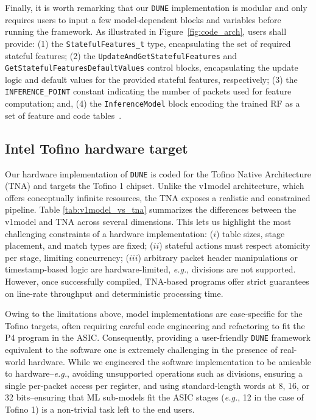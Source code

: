 \documentclass[journal]{IEEEtran}
\theoremstyle{plain} %
\newcommand{\eg}{\textit{e.g.},\xspace}
\newcommand{\name}{\texttt{\fontsize{9}{11}\selectfont DUNE}\xspace}
\begin{document}
Finally, it is worth remarking that our \name implementation is modular and only requires users to input a few model-dependent blocks and variables before running the framework. As illustrated in Figure~\ref{fig:code_arch}, users shall provide: (1) the \texttt{\footnotesize StatefulFeatures\_t} type, encapsulating the set of required stateful features; (2) the \texttt{\footnotesize UpdateAndGetStatefulFeatures} and \texttt{\footnotesize GetStatefulFeaturesDefaultValues} control blocks, encapsulating the update logic and default values for the provided stateful features, respectively; (3) the \texttt{\footnotesize INFERENCE\_POINT} constant indicating the number of packets used for feature computation; and, (4) the \texttt{\footnotesize InferenceModel} block encoding the trained RF as a set of feature and code tables~\cite{ilsy-hotnets19}.

\subsection{Intel Tofino hardware target}
\label{sub:hardware}



Our hardware implementation of \name is coded for the Tofino Native Architecture (TNA) and targets the Tofino 1 chipset.
%
Unlike the v1model architecture, which offers conceptually infinite resources, the TNA exposes a realistic and constrained pipeline.
Table \ref{tab:v1model_vs_tna} summarizes the differences between the v1model and TNA across several dimensions. This lets us highlight the most challenging constraints of a hardware implementation: ($i$) table sizes, stage placement, and match types are fixed; ($ii$) stateful actions must respect atomicity per stage, limiting concurrency; ($iii$) arbitrary packet header manipulations or timestamp-based logic are hardware-limited, \eg divisions are not supported.
However, once successfully compiled, TNA-based programs offer strict guarantees on line-rate throughput and deterministic processing time.

Owing to the limitations above, model implementations are case-specific for the Tofino targets, often requiring careful code engineering and refactoring to fit the P4 program in the ASIC.
Consequently, providing a user-friendly \name framework equivalent to the software one is extremely challenging in the presence of real-world hardware.
While we engineered the software implementation to be amicable to hardware--\eg avoiding unsupported operations such as divisions, ensuring a single per-packet access per register, and using standard-length words at 8, 16, or 32 bits--ensuring that ML sub-models fit the ASIC stages (\eg 12 in the case of Tofino 1) is a non-trivial task left to the end users.
\end{document}
